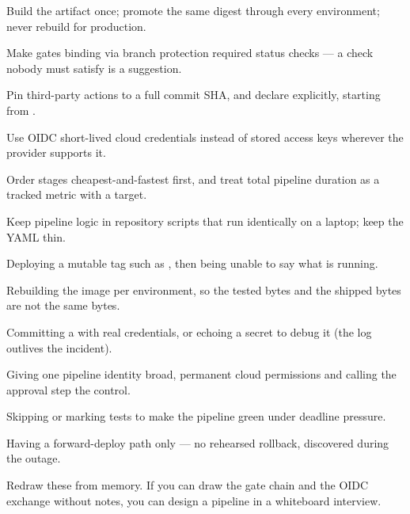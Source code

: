 \begin{bestpractices}
\begin{wbitem}
  \item Build the artifact once; promote the same digest through every environment; never rebuild for production.
  \item Make gates binding via branch protection required status checks --- a check nobody must satisfy is a suggestion.
  \item Pin third-party actions to a full commit SHA, and declare  explicitly, starting from .
  \item Use OIDC short-lived cloud credentials instead of stored access keys wherever the provider supports it.
  \item Order stages cheapest-and-fastest first, and treat total pipeline duration as a tracked metric with a target.
  \item Keep pipeline logic in repository scripts that run identically on a laptop; keep the YAML thin.
\end{wbitem}
\end{bestpractices}
\begin{mistakes}
\begin{wbitem}
  \item Deploying a mutable tag such as , then being unable to say what is running.
  \item Rebuilding the image per environment, so the tested bytes and the shipped bytes are not the same bytes.
  \item Committing a  with real credentials, or echoing a secret to debug it (the log outlives the incident).
  \item Giving one pipeline identity broad, permanent cloud permissions and calling the approval step the control.
  \item Skipping or marking tests  to make the pipeline green under deadline pressure.
  \item Having a forward-deploy path only --- no rehearsed rollback, discovered during the outage.
\end{wbitem}
\end{mistakes}


Redraw these from memory. If you can draw the gate chain and the OIDC exchange without notes, you can design a pipeline in a whiteboard interview.

